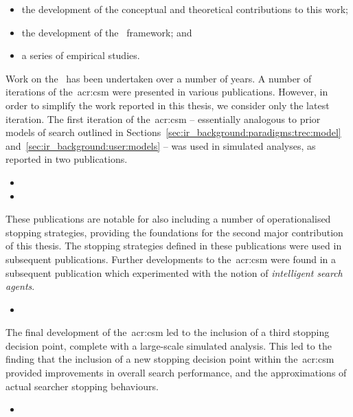 \begin{itemize}
    \item{the development of the conceptual and theoretical contributions to this work;}
    \item{the development of the \simiir~framework; and}
    \item{a series of empirical studies.}
\end{itemize}

\noindent
{}
Work on the~ has been undertaken over a number of years. A number of iterations of the~\gls{acr:csm} were presented in various publications. However, in order to simplify the work reported in this thesis, we consider only the latest iteration. The first iteration of the~\gls{acr:csm} -- essentially analogous to prior models of search outlined in Sections~\ref{sec:ir_background:paradigms:trec:model} and~\ref{sec:ir_background:user:models} -- was used in simulated analyses, as reported in two publications.

\begin{itemize}
    \item{}
    \item{}
\end{itemize}

These publications are notable for also including a number of operationalised stopping strategies, providing the foundations for the second major contribution of this thesis. The stopping strategies defined in these publications were used in subsequent publications. Further developments to the~\gls{acr:csm} were found in a subsequent publication which experimented with the notion of \emph{intelligent search agents}.

\begin{itemize}
    \item{}
\end{itemize}

The final development of the~\gls{acr:csm} led to the inclusion of a third stopping decision point, complete with a large-scale simulated analysis. This led to the finding that the inclusion of a new stopping decision point within the~\gls{acr:csm} provided improvements in overall search performance, and the approximations of actual searcher stopping behaviours.

\begin{itemize}
    \item{}
\end{itemize}


